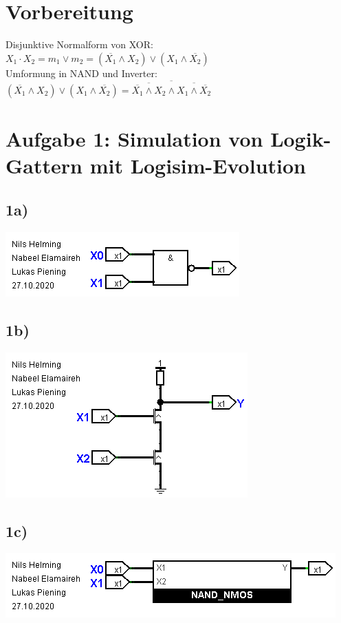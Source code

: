 \documentclass[]{article}
\newcommand{\V}{\lor}
\newcommand{\A}{\land}
\newcommand{\T}[1]{\overline{#1}}
\begin{document}
\section*{Vorbereitung}
	Disjunktive Normalform von XOR:\\
	$ X_1 \cdot X_2 = m_1 \V m_2 = (\T{X_1} \A X_2) \V (X_1 \A \T{X_2}) $\\
	Umformung in NAND und Inverter:\\
	$ (\T{X_1} \A X_2) \V (X_1 \A \T{X_2}) = \T{\T{\T{X_1} \A X_2} \A \T{X_1 \A \T{X_2}}}$
\section*{Aufgabe 1: Simulation von Logik-Gattern mit Logisim-Evolution}
\subsection*{1a)}
	\begin{center}\includegraphics[scale=0.7]{Bilder/1_a.png}\end{center}
\subsection*{1b)}
	\begin{center}\includegraphics[scale=0.7]{Bilder/1_b.png}\end{center}
\subsection*{1c)}
	\begin{center}\includegraphics[scale=0.7]{Bilder/1_c.png}\end{center}
\end{document}
